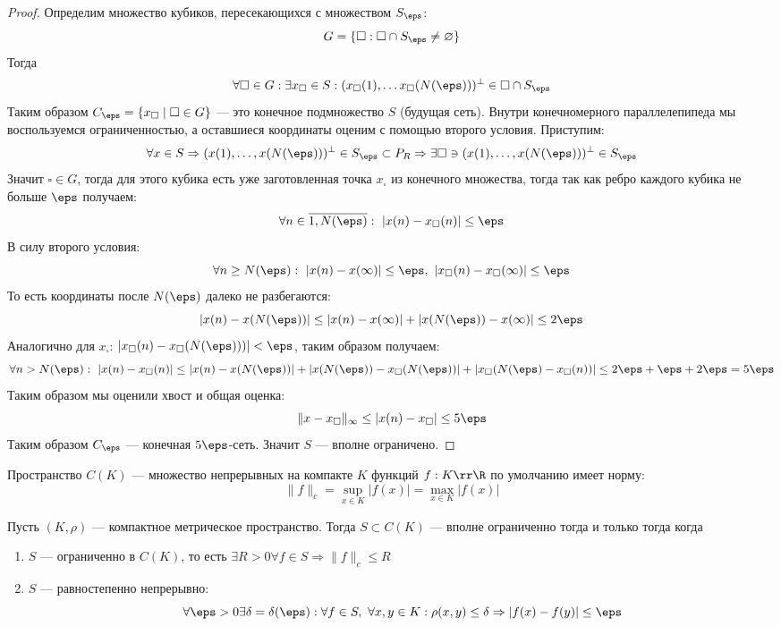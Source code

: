 \begin{proof}
	Определим множество кубиков, пересекающихся с множеством $S_\eps$:
	$$
	G = \{ \square : \square \cap S_\eps \neq \varnothing\}
	$$
	Тогда 
	$$
	\forall \square \in G : \exists x_\square \in S: (x_\square(1), \dots x_\square(N(\eps)))^\perp \in \square \cap S_\eps 
	$$
	Таким образом $C_\eps = \{x_\square \mid \square \in G \}$ --- это конечное подмножество $S$ (будущая сеть). Внутри конечномерного параллелепипеда мы воспользуемся ограниченностью, а оставшиеся координаты оценим с помощью второго условия. Приступим: 
	$$
	\forall x \in S \Rightarrow (x(1), \dots, x(N(\eps)))^\perp \in S_\eps \subset P_R \Rightarrow \exists \square \ni (x(1), \dots, x(N(\eps)))^\perp \in S_\eps
	$$
	Значит $\square \in G$, тогда для этого кубика есть уже заготовленная точка $x_\square$ из конечного множества, тогда так как ребро каждого кубика не больше $\eps$ получаем:
	$$
	\forall n \in \overline{1, N(\eps)}: \ |x(n) - x_\square(n)| \leq \eps 
	$$
	В силу второго условия:
	$$
	\forall n \geq N(\eps): \ |x(n) - x(\infty)| \leq \eps, \ |x_\square(n) - x_\square(\infty)| \leq \eps
	$$
	То есть координаты после $N(\eps)$ далеко не разбегаются:
	$$
	|x(n) - x(N(\eps))| \leq |x(n) - x(\infty)| + |x(N(\eps)) - x(\infty)| \leq 2\eps
	$$
	Аналогично для $x_\square$: $|x_\square(n) - x_\square(N(\eps)))| < \eps$, таким образом получаем:
	$$
	\forall n > N(\eps): \ |x(n)-x_\square(n)| \leq |x(n) - x(N(\eps))| + |x(N(\eps)) - x_\square(N(\eps))| + |x_\square(N(\eps) - x_\square(n))| \leq 2\eps + \eps + 2\eps = 5\eps
	$$
	Таким образом мы оценили хвост и общая оценка:
	$$\|x- x_\square\|_\infty \leq |x(n) - x_\square| \leq 5\eps$$
	Таким образом $C_\eps$ --- конечная $5\eps$-сеть. Значит $S$ --- вполне ограничено.
\end{proof}
\begin{definition}
	Пространство $C(K)$ --- множество непрерывных на компакте $K$ функций $f : K \rr \R$ по умолчанию имеет норму:
	$$
	\|f\|_c  = \sup\limits_{x \in K} |f(x)| = \max\limits_{x \in K}|f(x)|
	$$
\end{definition}
\begin{theorem}\label{th:arzela}
	Пусть $(K, \rho)$ --- компактное метрическое пространство. Тогда $S \subset C(K)$ --- вполне ограниченно тогда и только тогда когда
	\begin{enumerate}
		\item $S$ --- ограниченно в $C(K)$, то есть $\exists R > 0 \forall f \in S \Rightarrow \|f\|_c \leq R$
		\item $S$ --- равностепенно непрерывно: 
		$$
		\forall \eps > 0 \exists \delta = \delta(\eps): \forall f \in S, \ \forall x, y \in K : \rho(x,y) \leq \delta \Rightarrow |f(x) - f(y)| \leq \eps 
		$$
	\end{enumerate}
\end{theorem}
